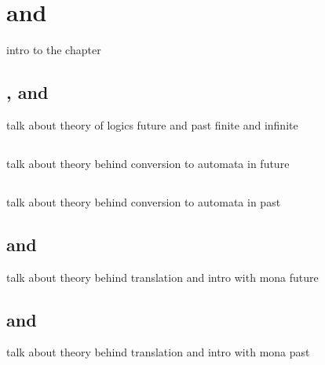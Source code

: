 \chapter{\PLTL and \LTLf}
intro to the chapter
\section{\LTL, \LTLf and \PLTL}
talk about theory of logics future and past finite and infinite
\section{\LTLfToDFA}
talk about theory behind conversion to automata in future
\section{\PLTLToDFA}
talk about theory behind conversion to automata in past
\section{\LTLfToFOL and \MONA}
talk about theory behind translation and intro with mona future
\section{\PLTLToFOL and \MONA}
talk about theory behind translation and intro with mona past
